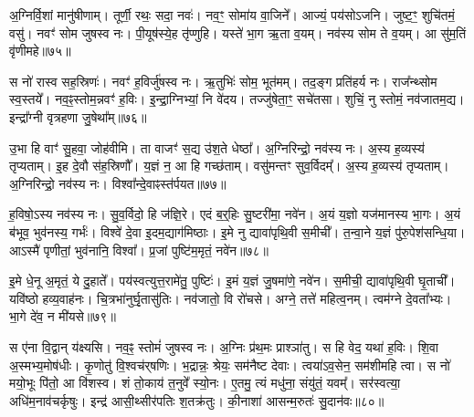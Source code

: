 अ॒ग्निर्वि॒शां मानु॑षीणाम्।
तूर्णी॒ रथः॒ सदा॒ नवः॑।
नव॒ꣳ॒ सोमा॑य वा॒जिने᳚।
आज्यं॒ पय॑सोऽजनि।
जुष्ट॒ꣳ॒ शुचि॑तमं॒ वसु॑।
नवꣳ॑ सोम जुषस्व नः।
पी॒यूष॑स्ये॒ह तृ॑प्णुहि।
यस्ते॑ भा॒ग ऋ॒ता व॒यम्।
नव॑स्य सोम ते व॒यम्।
आ सु॑म॒तिं वृ॑णीमहे॥७५॥

स नो॑ रास्व सह॒स्रिणः॑।
नवꣳ॑ ह॒विर्जु॑षस्व नः।
ऋ॒तुभिः॑ सोम॒ भूत॑मम्।
तद॒ङ्ग प्रति॑\-हर्य नः।
राज᳚न्थ्सोम स्व॒स्तये᳚।
नव॒ꣴ॒स्तोम॒न्नवꣳ॑ ह॒विः।
इ॒न्द्रा॒ग्निभ्यां॒ नि वे॑दय।
तज्जु॑षेता॒ꣳ॒ सचे॑तसा।
शुचिं॒ नु स्तोमं॒ नव॑जातम॒द्य।
इन्द्रा᳚ग्नी वृत्रहणा जु॒षेथा᳚म्॥७६॥

उ॒भा हि वाꣳ॑ सु॒हवा॒ जोह॑वीमि।
ता वाजꣳ॑ स॒द्य उ॑श॒ते धेष्ठा᳚।
अ॒ग्निरिन्द्रो॒ नव॑स्य नः।
अ॒स्य ह॒व्यस्य॑ तृप्यताम्।
इ॒ह दे॒वौ स॑ह॒स्रिणौ᳚।
य॒ज्ञं न॒ आ हि गच्छ॑ताम्।
वसु॑मन्तꣳ सुव॒र्विदम्᳚।
अ॒स्य ह॒व्यस्य॑ तृप्यताम्।
अ॒ग्निरिन्द्रो॒ नव॑स्य नः।
विश्वा᳚न्दे॒वाꣴस्त॑र्पयत॥७७॥

ह॒विषो॒ऽस्य नव॑स्य नः।
सु॒व॒र्विदो॒ हि ज॑ज्ञि॒रे।
एदं ब॒र्॒हिः सु॒ष्टरी॑मा॒ नवे॑न।
अ॒यं य॒ज्ञो यज॑मानस्य भा॒गः।
अ॒यं ब॑भूव॒ भुव॑नस्य॒ गर्भः॑।
विश्वे॑ दे॒वा इ॒दम॒द्याग॑मिष्ठाः।
इ॒मे नु द्यावा॑पृथि॒वी स॒मीची᳚।
त॒न्वा॒ने य॒ज्ञं पु॑रु॒पेश॑सन्धि॒या।
आऽस्मै॑ पृणीतां॒ भुव॑नानि॒ विश्वा᳚।
प्र॒जां पुष्टि॑म॒मृतं॒ नवे॑न॥७८॥

इ॒मे धे॒नू अ॒मृतं॒ ये दु॒हाते᳚।
पय॑स्वत्युत्त॒रामे॑तु॒ पुष्टिः॑।
इ॒मं य॒ज्ञं जु॒षमा॑णे॒ नवे॑न।
स॒मीची॒ द्यावा॑पृथि॒वी घृ॒ताची᳚।
यवि॑ष्ठो हव्य॒वाह॑नः।
चि॒त्रभा॑नुर्घृ॒तासु॑तिः।
नव॑जातो॒ वि रो॑चसे।
अग्ने॒ तत्ते॑ महित्व॒नम्।
त्वम॑ग्ने दे॒वता᳚भ्यः।
भा॒गे दे॑व॒ न मी॑यसे॥७९॥

स ए॑ना वि॒द्वान् य॑क्ष्यसि।
नव॒ꣴ॒ स्तोमं॑ जुषस्व नः।
अ॒ग्निः प्र॑थ॒मः प्राश्ञा॑तु।
स हि वेद॒ यथा॑ ह॒विः।
शि॒वा अ॒स्मभ्य॒मोष॑धीः।
कृ॒णोतु॑ वि॒श्वच॑र्‌\mbox{}षणिः।
भ॒द्रान्नः॒ श्रेयः॒ सम॑नैष्ट देवाः।
त्वया॑\-ऽव॒सेन॒ सम॑शीमहि त्वा।
स नो॑ मयो॒भूः पि॑तो॒ आ वि॑शस्व।
शं तो॒काय॑ त॒नुवे᳚ स्यो॒नः।
ए॒तमु॒ त्यं मधु॑ना॒ संयु॑तं॒ यवम्᳚।
सर॑स्वत्या॒ अधि॑म॒नाव॑चर्कृषुः।
इन्द्र॑ आसी॒थ्सीर॑पतिः श॒तक्र॑तुः।
की॒नाशा॑ आसन्म॒रुतः॑ सु॒दान॑वः॥८०॥\anuvakamend[पु॒र॒ए॒ता वृ॑णीमहे जु॒षेथा᳚न्तर्पयता॒मृत॒न्नवे॑न मीयसे स्यो॒नश्च॒त्वारि॑ च]




\clearpage
{}
\setcounter{anuvakam}{0}


